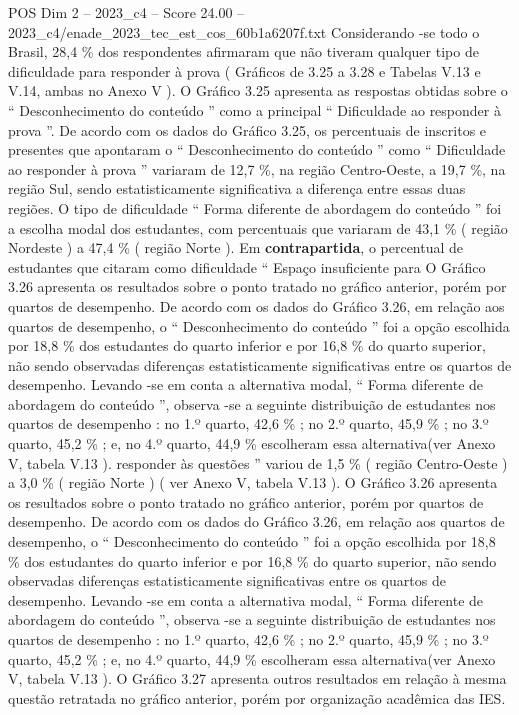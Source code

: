 \begin{textsample}{POS Dim 2 – 2023\_c4 – Score 24.00 – 2023\_c4/enade\_2023\_tec\_est\_cos\_60b1a6207f.txt}
Considerando -se todo o Brasil, 28,4 \% dos respondentes afirmaram que não tiveram qualquer tipo de dificuldade para responder à prova ( Gráficos de 3.25 a 3.28 e Tabelas V.13 e V.14, ambas no Anexo V ).
O Gráfico 3.25 apresenta as respostas obtidas sobre o “ Desconhecimento do conteúdo ” como a principal “ Dificuldade ao responder à prova ”.
De acordo com os dados do Gráfico 3.25, os percentuais de inscritos e presentes que apontaram o “ Desconhecimento do conteúdo ” como “ Dificuldade ao responder à prova ” variaram de 12,7 \%, na região Centro-Oeste, a 19,7 \%, na região Sul, sendo estatisticamente significativa a diferença entre essas duas regiões.
O tipo de dificuldade “ Forma diferente de abordagem do conteúdo ” foi a escolha modal dos estudantes, com percentuais que variaram de 43,1 \% ( região Nordeste ) a 47,4 \% ( região Norte ).
Em \textbf{contrapartida}, o percentual de estudantes que citaram como dificuldade “ Espaço insuficiente para O Gráfico 3.26 apresenta os resultados sobre o ponto tratado no gráfico anterior, porém por quartos de desempenho.
De acordo com os dados do Gráfico 3.26, em relação aos quartos de desempenho, o “ Desconhecimento do conteúdo ” foi a opção escolhida por 18,8 \% dos estudantes do quarto inferior e por 16,8 \% do quarto superior, não sendo observadas diferenças estatisticamente significativas entre os quartos de desempenho.
Levando -se em conta a alternativa modal, “ Forma diferente de abordagem do conteúdo ”, observa -se a seguinte distribuição de estudantes nos quartos de desempenho : no 1.º quarto, 42,6 \% ; no 2.º quarto, 45,9 \% ; no 3.º quarto, 45,2 \% ; e, no 4.º quarto, 44,9 \% escolheram essa alternativa(ver Anexo V, tabela V.13 ). responder às questões ” variou de 1,5 \% ( região Centro-Oeste ) a 3,0 \% ( região Norte ) ( ver Anexo V, tabela V.13 ).
O Gráfico 3.26 apresenta os resultados sobre o ponto tratado no gráfico anterior, porém por quartos de desempenho.
De acordo com os dados do Gráfico 3.26, em relação aos quartos de desempenho, o “ Desconhecimento do conteúdo ” foi a opção escolhida por 18,8 \% dos estudantes do quarto inferior e por 16,8 \% do quarto superior, não sendo observadas diferenças estatisticamente significativas entre os quartos de desempenho.
Levando -se em conta a alternativa modal, “ Forma diferente de abordagem do conteúdo ”, observa -se a seguinte distribuição de estudantes nos quartos de desempenho : no 1.º quarto, 42,6 \% ; no 2.º quarto, 45,9 \% ; no 3.º quarto, 45,2 \% ; e, no 4.º quarto, 44,9 \% escolheram essa alternativa(ver Anexo V, tabela V.13 ).
O Gráfico 3.27 apresenta outros resultados em relação à mesma questão retratada no gráfico anterior, porém por organização acadêmica das IES.

\end{textsample}
